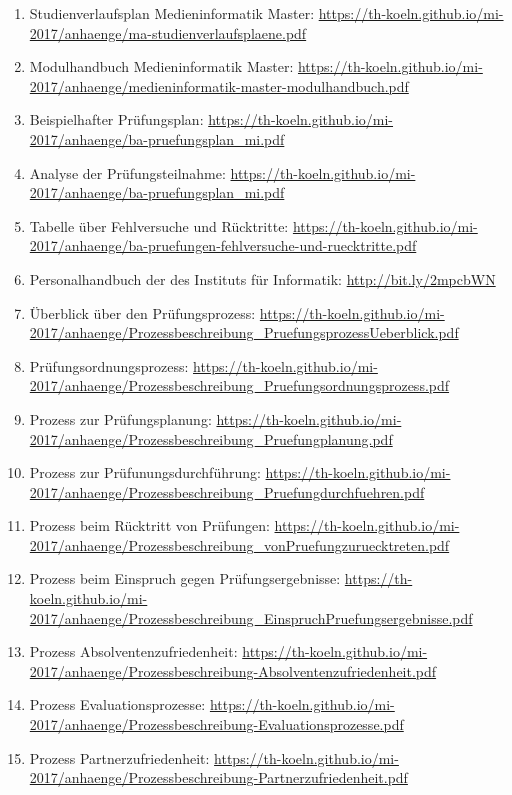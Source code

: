 \documentclass[BCOR12mm,DIV11,titlepage,a4paper,oneside,10pt]{scrbook}
\begin{document}
\begin{sloppypar}
\begin{flushleft}
\begin{enumerate}
\item{Studienverlaufsplan Medieninformatik Master: \url{https://th-koeln.github.io/mi-2017/anhaenge/ma-studienverlaufsplaene.pdf} } 
\item{Modulhandbuch Medieninformatik Master: \url{https://th-koeln.github.io/mi-2017/anhaenge/medieninformatik-master-modulhandbuch.pdf} } 
\item{Beispielhafter Prüfungsplan: \url{https://th-koeln.github.io/mi-2017/anhaenge/ba-pruefungsplan\_mi.pdf} } 
\item{Analyse der Prüfungsteilnahme: \url{https://th-koeln.github.io/mi-2017/anhaenge/ba-pruefungsplan\_mi.pdf} } 
\item{Tabelle über Fehlversuche und Rücktritte: \url{https://th-koeln.github.io/mi-2017/anhaenge/ba-pruefungen-fehlversuche-und-ruecktritte.pdf} } 
\item{Personalhandbuch der des Instituts für Informatik: \url{http://bit.ly/2mpcbWN} } 
\item{Überblick über den Prüfungsprozess: \url{https://th-koeln.github.io/mi-2017/anhaenge/Prozessbeschreibung\_PruefungsprozessUeberblick.pdf} } 
\item{Prüfungsordnungsprozess: \url{https://th-koeln.github.io/mi-2017/anhaenge/Prozessbeschreibung\_Pruefungsordnungsprozess.pdf} } 
\item{Prozess zur Prüfungsplanung: \url{https://th-koeln.github.io/mi-2017/anhaenge/Prozessbeschreibung\_Pruefungplanung.pdf} } 
\item{Prozess zur Prüfunungsdurchführung: \url{https://th-koeln.github.io/mi-2017/anhaenge/Prozessbeschreibung\_Pruefungdurchfuehren.pdf} } 
\item{Prozess beim Rücktritt von Prüfungen: \url{https://th-koeln.github.io/mi-2017/anhaenge/Prozessbeschreibung\_vonPruefungzuruecktreten.pdf} } 
\item{Prozess beim Einspruch gegen Prüfungsergebnisse: \url{https://th-koeln.github.io/mi-2017/anhaenge/Prozessbeschreibung\_EinspruchPruefungsergebnisse.pdf} } 
\item{Prozess Absolventenzufriedenheit: \url{https://th-koeln.github.io/mi-2017/anhaenge/Prozessbeschreibung-Absolventenzufriedenheit.pdf} } 
\item{Prozess Evaluationsprozesse: \url{https://th-koeln.github.io/mi-2017/anhaenge/Prozessbeschreibung-Evaluationsprozesse.pdf} } 
\item{Prozess Partnerzufriedenheit: \url{https://th-koeln.github.io/mi-2017/anhaenge/Prozessbeschreibung-Partnerzufriedenheit.pdf} } 

\end{enumerate}
\end{flushleft}
\end{sloppypar}
\end{document}
